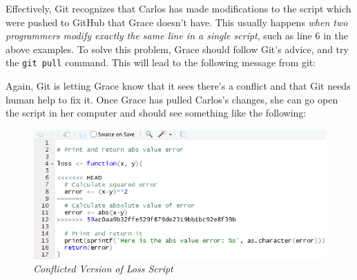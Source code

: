 \documentclass[]{book}
\newenvironment{Shaded}{\begin{snugshade}}{\end{snugshade}}
\newcommand{\KeywordTok}[1]{\textcolor[rgb]{0.13,0.29,0.53}{\textbf{#1}}}
\newcommand{\DecValTok}[1]{\textcolor[rgb]{0.00,0.00,0.81}{#1}}
\newcommand{\StringTok}[1]{\textcolor[rgb]{0.31,0.60,0.02}{#1}}
\newcommand{\ControlFlowTok}[1]{\textcolor[rgb]{0.13,0.29,0.53}{\textbf{#1}}}
\newcommand{\OperatorTok}[1]{\textcolor[rgb]{0.81,0.36,0.00}{\textbf{#1}}}
\newcommand{\ErrorTok}[1]{\textcolor[rgb]{0.64,0.00,0.00}{\textbf{#1}}}
\newcommand{\NormalTok}[1]{#1}
\begin{document}
Effectively, Git recognizes that Carlos has made modifications to the
script which were pushed to GitHub that Grace doesn't have. This usually
happens \emph{when two programmers modify exactly the same line in a
single script}, such as line 6 in the above examples. To solve this
problem, Grace should follow Git's advice, and try the
\texttt{git\ pull} command. This will lead to the following message from
git:

\begin{Shaded}
\end{Shaded}

Again, Git is letting Grace know that it sees there's a conflict and
that Git needs human help to fix it. Once Grace has pulled Carlos's
changes, she can go open the script in her computer and should see
something like the following:

\begin{figure}
\centering
\includegraphics{images/lossConflict.PNG}
\caption{\emph{Conflicted Version of Loss Script}}
\end{figure}
\end{document}
